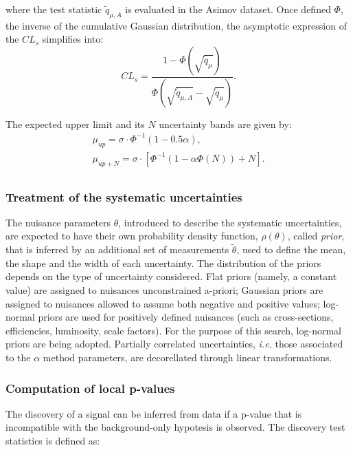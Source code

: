 \noindent where the test statistic $\tilde{q}_{\mu, A}$ is evaluated in the Asimov dataset. Once defined $\Phi$, the inverse of the cumulative Gaussian distribution, the asymptotic expression of the $CL_s$ simplifies into:
\begin{equation}
CL_s = \frac{1 - \Phi \left( \sqrt{\tilde{q}_{\mu}} \right)}{ \Phi \left( \sqrt{\tilde{q}_{\mu, A}} - \sqrt{\tilde{q}_{\mu}} \right) }.
\end{equation}

\noindent The expected upper limit and its $N$ uncertainty bands are given by:
\begin{equation}
\begin{gathered}
\mu_{up} = \sigma \cdot \Phi^{-1} \left( 1 - 0.5 \alpha \right),\\
\mu_{up + N} = \sigma \cdot \left[ \Phi^{-1}  \left( 1 - \alpha \Phi(N)  \right) + N \right].\\
\end{gathered}
\end{equation}

\subsubsection{Treatment of the systematic uncertainties}
The nuisance parameters $\theta$, introduced to describe the systematic uncertainties, are expected to have their own probability density function, $\rho (\theta)$, called \emph{prior}, that is inferred by an additional set of measurements $\tilde{\theta}$, used to define the mean, the shape and the width of each uncertainty. The distribution of the priors depends on the type of uncertainty considered. Flat priors (namely, a constant value) are assigned to nuisances unconstrained a-priori; Gaussian priors are assigned to nuisances allowed to assume both negative and positive values; log-normal priors are used for positively defined nuisances (such as cross-sections, efficiencies, luminosity, scale factors). For the purpose of this search, log-normal priors are being adopted. Partially correlated uncertainties, \textit{i.e.} those associated to the $\alpha$ method parameters, are decorellated through linear transformations.

\subsubsection{Computation of local p-values}
The discovery of a signal can be inferred from data if a p-value that is incompatible with the background-only hypotesis is observed. The discovery test statistics is defined as:

